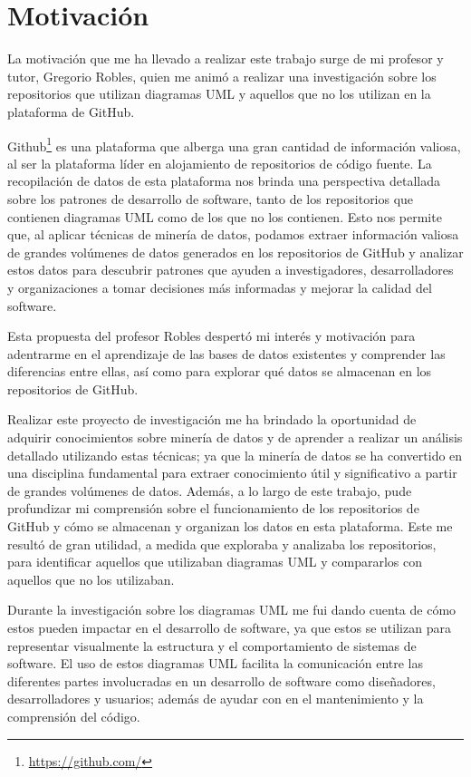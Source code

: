 \documentclass[a4paper, 12pt]{book}
\begin{document}
\section{Motivación} %
\label{sec:motivación} %

La motivación que me ha llevado a realizar este trabajo surge de mi profesor y tutor, Gregorio Robles, quien me animó a realizar una investigación sobre los repositorios que utilizan diagramas UML y aquellos que no los utilizan en la plataforma de GitHub.


Github\footnote{\url{https://github.com/}} es una plataforma que alberga una gran cantidad de información valiosa, al ser la plataforma líder en alojamiento de repositorios de código fuente. 
La recopilación de datos de esta plataforma nos brinda una perspectiva detallada sobre los patrones de desarrollo de software, tanto de los repositorios que contienen diagramas UML como de los que no los contienen.
Esto nos permite que, al aplicar técnicas de minería de datos, podamos extraer información valiosa de grandes volúmenes de datos generados en los repositorios de GitHub y analizar estos datos para descubrir patrones que ayuden a investigadores, desarrolladores y organizaciones a tomar decisiones más informadas y mejorar la calidad del software.


Esta propuesta del profesor Robles despertó mi interés y motivación para adentrarme en el aprendizaje de las bases de datos existentes y comprender las diferencias entre ellas, así como para explorar qué datos se almacenan en los repositorios de GitHub.


Realizar este proyecto de investigación me ha brindado la oportunidad de adquirir conocimientos sobre minería de datos y de aprender a realizar un análisis detallado utilizando estas técnicas; ya que la minería de datos se ha convertido en una disciplina fundamental para extraer conocimiento útil y significativo a partir de grandes volúmenes de datos.
Además, a lo largo de este trabajo, pude profundizar mi comprensión sobre el funcionamiento de los repositorios de GitHub y cómo se almacenan y organizan los datos en esta plataforma. 
Este me resultó de gran utilidad, a medida que exploraba y analizaba los repositorios, para identificar aquellos que utilizaban diagramas UML y compararlos con aquellos que no los utilizaban.


Durante la investigación sobre los diagramas UML me fui dando cuenta de cómo estos pueden impactar en el desarrollo de software, ya que estos se utilizan para representar visualmente la estructura y el comportamiento de sistemas de software.
El uso de estos diagramas UML facilita la comunicación entre las diferentes partes involucradas en un desarrollo de software como diseñadores, desarrolladores y usuarios; además de ayudar con en el mantenimiento y la comprensión del código.
\end{document}
